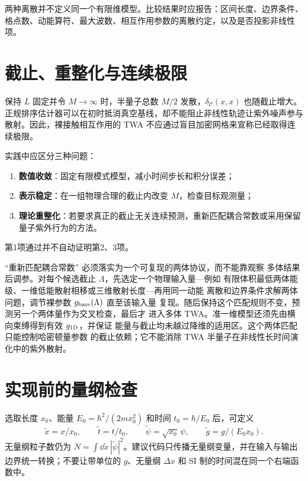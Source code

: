 两种离散并不定义同一个有限维模型。比较结果时应报告：区间长度、边界条件、格点数、动能算符、最大波数、相互作用参数的离散约定，以及是否投影非线性项。

\section{截止、重整化与连续极限}

保持 $L$ 固定并令 $M\to\infty$ 时，半量子总数 $M/2$ 发散，$\delta_{\mathcal C}(x,x)$ 也随截止增大。正规排序估计器可以在初时抵消真空基线，却不能阻止非线性轨迹让紫外噪声参与散射。因此，裸接触相互作用的 TWA 不应通过盲目加密网格来宣称已经取得连续极限。

实践中应区分三种问题：
\begin{enumerate}
  \item \textbf{数值收敛}：固定有限模式模型，减小时间步长和积分误差；
  \item \textbf{表示稳定}：在一组物理合理的截止内改变 $M$，检查目标观测量；
  \item \textbf{理论重整化}：若要求真正的截止无关连续预测，重新匹配耦合常数或采用保留量子紫外行为的方法。
\end{enumerate}
第1项通过并不自动证明第2、3项。

``重新匹配耦合常数'' 必须落实为一个可复现的两体协议，而不能靠观察
多体结果后调参。对每个候选截止 $\Lambda$，先选定一个物理输入量---例如
有限体积最低两体能级、一维低能散射相移或三维散射长度---再用同一动能
离散和边界条件求解两体问题，调节裸参数 $g_{\rm bare}(\Lambda)$ 直至该输入量
复现。随后保持这个匹配规则不变，预测另一个两体量作为交叉检查，最后才
进入多体 TWA。准一维模型还须先由横向束缚得到有效 $g_{1\rm D}$，并保证
能量与截止均未越过降维的适用区。这个两体匹配只能控制哈密顿量参数
的截止依赖；它不能消除 TWA 半量子在非线性长时间演化中的紫外散射。

\section{实现前的量纲检查}

选取长度 $x_0$、能量 $E_0=\hbar^2/(2mx_0^2)$ 和时间 $t_0=\hbar/E_0$ 后，可定义
\begin{equation}
  \tilde x=x/x_0,
  \qquad
  \tilde t=t/t_0,
  \qquad
  \tilde\psi=\sqrt{x_0}\,\psi,
  \qquad
  \tilde g=g/(E_0x_0).
\end{equation}
无量纲粒子数仍为 $N=\int\dd\tilde x\,|\tilde\psi|^2$。建议代码只传播无量纲变量，并在输入与输出边界统一转换；不要让带单位的 $g$、无量纲 $\Delta x$ 和 SI 制的时间混在同一个右端函数中。

